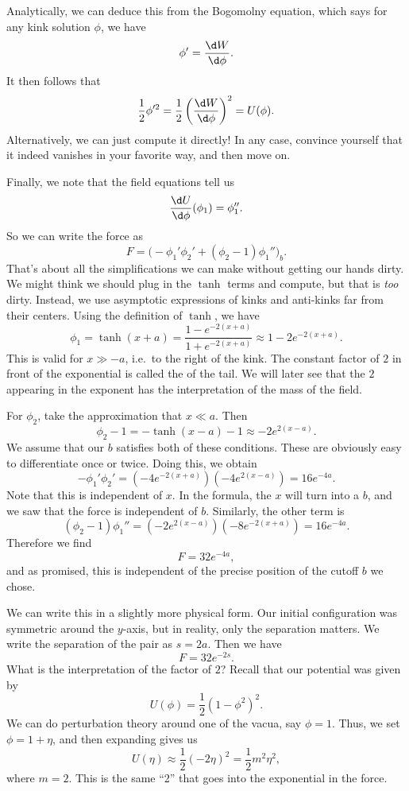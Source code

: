 \documentclass[a4paper]{article}
\begin{document}
Analytically, we can deduce this from the Bogomolny equation, which says for any kink solution $\phi$, we have
\[
  \phi' = \frac{\d W}{\d \phi}.
\]
It then follows that
\[
  \frac{1}{2} \phi'^2 = \frac{1}{2} \left(\frac{\d W}{\d \phi}\right)^2 = U(\phi).
\]
Alternatively, we can just compute it directly! In any case, convince yourself that it indeed vanishes in your favorite way, and then move on.

Finally, we note that the field equations tell us
\[
  \frac{\d U}{\d \phi}(\phi_1) = \phi_1''.
\]
So we can write the force as
\[
  F = \big(-\phi_1' \phi_2' + (\phi_2 - 1) \phi_1''\big)_b.
\]
That's about all the simplifications we can make without getting our hands dirty. We might think we should plug in the $\tanh$ terms and compute, but that is \emph{too} dirty. Instead, we use asymptotic expressions of kinks and anti-kinks far from their centers. Using the definition of $\tanh$, we have
\[
  \phi_1 = \tanh(x + a) = \frac{1 - e^{-2(x + a)}}{1 + e^{-2(x + a)}} \approx 1 - 2e^{-2(x + a)}.
\]
This is valid for $x \gg -a$, i.e.\ to the right of the kink. The constant factor of $2$ in front of the exponential is called the  of the tail. We will later see that the $2$ appearing in the exponent has the interpretation of the mass of the field.

For $\phi_2$, take the approximation that $x \ll a$. Then
\[
  \phi_2 - 1= -\tanh(x - a) - 1 \approx -2 e^{2(x - a)}.
\]
We assume that our $b$ satisfies both of these conditions. These are obviously easy to differentiate once or twice. Doing this, we obtain
\[
  -\phi_1' \phi_2' = (-4e^{-2(x + a)})(-4 e^{2(x - a)}) = 16 e^{-4a}.
\]
Note that this is independent of $x$. In the formula, the $x$ will turn into a $b$, and we saw that the force is independent of $b$. Similarly, the other term is
\[
  (\phi_2 - 1) \phi_1'' = (-2e^{2(x - a)}) (-8 e^{-2(x + a)}) = 16 e^{-4a}.
\]
Therefore we find
\[
  F = 32 e^{-4a},
\]
and as promised, this is independent of the precise position of the cutoff $b$ we chose.

We can write this in a slightly more physical form. Our initial configuration was symmetric around the $y$-axis, but in reality, only the separation matters. We write the separation of the pair as $s = 2a$. Then we have
\[
  F = 32 e^{-2s}.
\]
What is the interpretation of the factor of $2$? Recall that our potential was given by
\[
  U(\phi) = \frac{1}{2}(1 - \phi^2)^2.
\]
We can do perturbation theory around one of the vacua, say $\phi = 1$. Thus, we set $\phi = 1 + \eta$, and then expanding gives us
\[
  U(\eta) \approx \frac{1}{2} (-2\eta)^2 = \frac{1}{2}m^2 \eta^2,
\]
where $m = 2$. This is the same ``2'' that goes into the exponential in the force.
\end{document}
